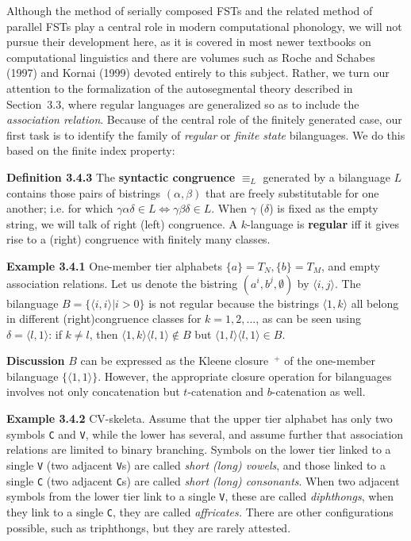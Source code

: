 Although the method of serially composed FSTs and the related method of
parallel FSTs \cite{Koskenniemi:1983} play a central role in modern
computational phonology, we will not pursue their development here, as it is
covered in most newer textbooks on computational linguistics and there are
volumes such as Roche and Schabes (1997) and Kornai (1999) devoted entirely to
this subject. \nocite{Roche:1997} \nocite{Kornai:1999} Rather, we turn our
attention to the formalization of the autosegmental theory described in
Section~3.3, where regular languages are generalized so as to include the {\it
  association relation}.  Because of the central
role of the finitely generated case, our first task is to identify the family
of {\it regular} or {\it finite state} bilanguages. We do this based on the
finite index property:

\smallskip\noindent
{\bf Definition 3.4.3} The {\bf syntactic congruence} $\equiv_L$
generated by a bilanguage $L$ contains those pairs of bistrings
$(\alpha,\beta)$ that are freely substitutable for one another; i.e.
for which $\gamma\alpha\delta \in L \Leftrightarrow \gamma\beta\delta
\in L$. When $\gamma$ ($\delta$) is fixed as the empty string, we will
talk of right (left) congruence. A $k$-language is {\bf regular} iff it gives
rise to a (right) congruence with finitely many classes.

\smallskip\noindent
{\bf Example 3.4.1} One-member tier alphabets $\{a\} = T_N, \{b\} = T_M$, and
empty association relations.  Let us denote the bistring $(a^i,b^j,\emptyset)$
by $\langle i,j\rangle $. The bilanguage $B = \{\langle i,i\rangle | i > 0\}$
is not regular because the bistrings $\langle 1,k\rangle $ all belong in
different (right)congruence classes for $k=1,2,...$, as can be seen using
$\delta=\langle l,1\rangle $: if $k \neq l$, then $\langle 1,k\rangle \langle
l,1\rangle \not\in B$ but $\langle 1,l\rangle \langle l,1\rangle \in B$.

\smallskip\noindent
{\bf Discussion} $B$ can be expressed as the Kleene closure~$^+$ of the
one-member bilanguage $\{\langle 1,1\rangle \}$. However, the appropriate
closure operation for bilanguages involves not only concatenation but
$t$-catenation and $b$-catenation as well.

\smallskip\noindent 
{\bf Example 3.4.2} CV-skeleta. Assume that the upper tier alphabet has only
two symbols {\tt C} and {\tt V}, while the lower has several, and assume
further that association relations are limited to binary branching. Symbols on
the lower tier linked to a single {\tt V} (two adjacent {\tt V}s) are called
{\it short (long) vowels}, and those linked to a single {\tt C} (two adjacent
{\tt C}s) are called {\it short (long) consonants}. When two adjacent symbols
from the lower tier link to a single {\tt V}, these are called {\it
  diphthongs}, when they link to a single {\tt C}, they are called {\it
  affricates.}
There are other configurations possible, such as triphthongs, but they are
rarely attested.

